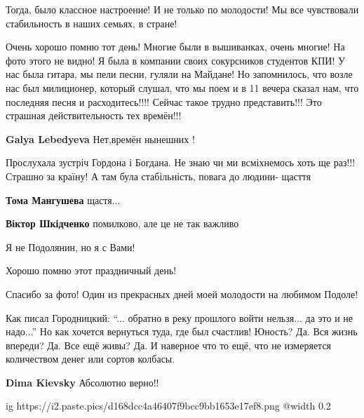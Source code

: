 \begin{itemize}

Тогда, было классное настроение! И не только по молодости! Мы все чувствовали
стабильность в наших семьях, в стране!


Очень хорошо помню тот день! Многие были в вышиванках, очень многие! На фото
этого не видно! Я была в компании своих сокурсников студентов КПИ! У нас была
гитара, мы пели песни, гуляли на Майдане! Но запомнилось, что возле нас был
милиционер, который слушал, что мы поем и в 11 вечера сказал нам, что последняя
песня и расходитесь!!!! Сейчас такое трудно представить!!! Это страшная
действительность тех времён!!!

\textbf{Galya Lebedyeva} Нет,времён нынешних !


Прослухала зустріч Гордона і Богдана. Не знаю чи ми всміхнемось хоть ще раз!!!
Страшно за країну! А там була стабільність, повага до людини- щасття

\begin{itemize} %
\textbf{Тома Мангушева} щастя...

\textbf{Віктор Шкідченко} помилково, але це не так важливо
\end{itemize} %

Я не Подолянин, но я с Вами!

Хорошо помню этот праздничный день!

Спасибо за фото! Один из прекрасных дней моей молодости на любимом Подоле!


Как писал Городницкий: \enquote{... обратно в реку прошлого войти нельзя... да это и не
надо...} Но как хочется вернуться туда, где был счастлив! Юность? Да. Вся жизнь
впереди? Да. Все ещё живы? Да. И наверное что то ещё, что не измеряется
количеством денег или сортов колбасы.

\textbf{Dima Kievsky} Абсолютно верно!!


\ifcmt
  ig https://i2.paste.pics/d168dcc4a46407f9bcc9bb1653e17ef8.png
  @width 0.2
\fi

\end{itemize} %
